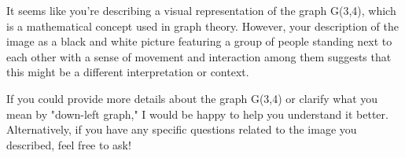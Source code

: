 It seems like you're describing a visual representation of the graph G(3,4), which is a mathematical concept used in graph theory. However, your description of the image as a black and white picture featuring a group of people standing next to each other with a sense of movement and interaction among them suggests that this might be a different interpretation or context.

If you could provide more details about the graph G(3,4) or clarify what you mean by "down-left graph," I would be happy to help you understand it better. Alternatively, if you have any specific questions related to the image you described, feel free to ask!